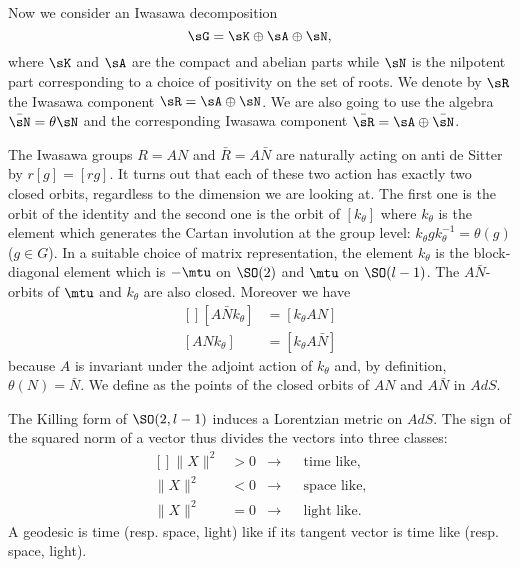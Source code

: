 Now we consider an Iwasawa decomposition
\begin{equation}
	\sG=\sK\oplus\sA\oplus\sN,
\end{equation}
where $\sK$ and $\sA$ are the compact and abelian parts while $\sN$ is the nilpotent part corresponding to a choice of positivity on the set of roots. We denote by $\sR$ the Iwasawa component $\sR=\sA\oplus\sN$. We are also going to use the algebra $\bar\sN=\theta\sN$ and the corresponding Iwasawa component $\bar\sR=\sA\oplus\bar\sN$.

The Iwasawa groups $R=AN$ and $\bar R=A\bar N$ are naturally acting on anti de Sitter by $r[g]=[rg]$. It turns out that each of these two action has exactly two closed orbits, regardless to the dimension we are looking at. The first one is the orbit of the identity and the second one is the orbit of $[k_{\theta}]$ where $k_{\theta}$ is the element which generates the Cartan involution at the group level: $k_{\theta}gk_{\theta}^{-1}=\theta(g)$ ($g\in G$). In a suitable choice of matrix representation, the element $k_{\theta}$ is the block-diagonal element which is $-\mtu$ on $\SO(2)$ and $\mtu$ on $\SO(l-1)$. The $A\bar N$-orbits of $\mtu$ and $k_{\theta}$ are also closed. Moreover we have
\begin{equation}
	\begin{aligned}[]
		[A\bar N k_{\theta}] & =[k_{\theta}AN]      \\
		[AN k_{\theta}]      & =[k_{\theta}A\bar N]
	\end{aligned}
\end{equation}
because $A$ is invariant under the adjoint action of $k_{\theta}$ and, by definition, $\theta(N)=\bar N$. We define as  the points of the closed orbits of $AN$ and $A\bar N$ in $AdS$.

The Killing form of $\SO(2,l-1)$ induces a Lorentzian metric on $AdS$. The sign of the squared norm of a vector thus divides the vectors into three classes:
\begin{equation}
	\begin{aligned}[]
		\| X \|^2 & >0 & \rightarrow &  & \text{time like,}  \\
		\| X \|^2 & <0 & \rightarrow &  & \text{space like,} \\
		\| X \|^2 & =0 & \rightarrow &  & \text{light like.}
	\end{aligned}
\end{equation}
A geodesic is time (resp. space, light) like if its tangent vector is time like (resp. space, light).

